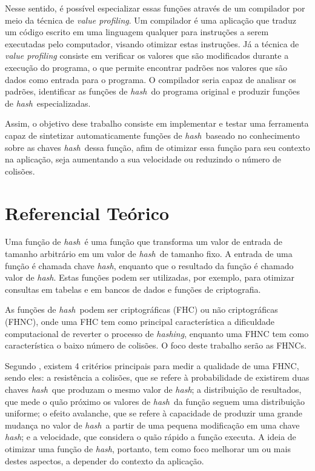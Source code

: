 \documentclass[12pt]{article}
\newcommand{\hash}{\textit{hash}}
\begin{document}
Nesse sentido, é possível especializar essas funções através de um compilador por meio da técnica de \textit{value profiling}. Um compilador é uma aplicação que traduz um código escrito em uma linguagem qualquer para instruções a serem executadas pelo computador, visando otimizar estas instruções. Já a técnica de \textit{value profiling} consiste em verificar os valores que são modificados durante a execução do programa, o que permite encontrar padrões nos valores que são dados como entrada para o programa. O compilador seria capaz de analisar os padrões, identificar as funções de \hash\ do programa original e produzir funções de \hash\ especializadas.

Assim, o objetivo dese trabalho consiste em implementar e testar uma ferramenta capaz de sintetizar automaticamente funções de \hash\ baseado no conhecimento sobre as chaves \hash\ dessa função, afim de otimizar essa função para seu contexto na aplicação, seja aumentando a sua velocidade ou reduzindo o número de colisões.

\section{Referencial Teórico}



Uma função de \hash\ é uma função que transforma um valor de entrada de tamanho arbitrário em um valor de \hash\ de tamanho fixo.
A entrada de uma função é chamada chave \hash, enquanto que o resultado da função é chamado valor de \hash.
Estas funções podem ser utilizadas, por exemplo, para otimizar consultas em tabelas e em bancos de dados e funções de criptografia.

As funções de \hash\ podem ser criptográficas (FHC) ou não criptográficas (FHNC), onde uma FHC tem como principal característica a dificuldade computacional de reverter o processo de \textit{hashing}, enquanto uma FHNC tem como característica o baixo número de colisões. O foco deste trabalho serão as FHNCs.

Segundo \cite{estebanez2014performance}, existem 4 critérios principais para medir a qualidade de uma FHNC, sendo eles: a resistência a colisões, que se refere à probabilidade de existirem duas chaves \hash\ que produzam o mesmo valor de \hash; a distribuição de resultados, que mede o quão próximo os valores de \hash\ da função seguem uma distribuição uniforme; o efeito avalanche, que se refere à capacidade de produzir uma grande mudança no valor de \hash\ a partir de uma pequena modificação em uma chave \hash; e a velocidade, que considera o quão rápido a função executa. A ideia de otimizar uma função de \hash, portanto, tem como foco melhorar um ou mais destes aspectos, a depender do contexto da aplicação.
\end{document}
